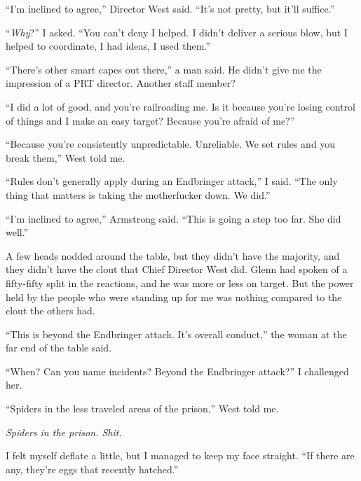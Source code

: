 ``I'm inclined to agree,'' Director West said.  ``It's not pretty, but it'll suffice.''



``\emph{Why}?'' I asked.  ``You can't deny I helped.  I didn't deliver a serious blow, but I helped to coordinate, I had ideas, I used them.''



``There's other smart capes out there,'' a man said.  He didn't give me the impression of a PRT director.  Another staff member?



``I did a lot of good, and you're railroading me.  Is it because you're losing control of things and I make an easy target?  Because you're afraid of me?''



``Because you're consistently unpredictable.  Unreliable.  We set rules and you break them,'' West told me.



``Rules don't generally apply during an Endbringer attack,'' I said.  ``The only thing that matters is taking the motherfucker down.  We did.''



``I'm inclined to agree,'' Armstrong said.  ``This is going a step too far.  She did well.''



A few heads nodded around the table, but they didn't have the majority, and they didn't have the clout that Chief Director West did.  Glenn had spoken of a fifty-fifty split in the reactions, and he was more or less on target.  But the power held by the people who were standing up for me was nothing compared to the clout the others had.



``This is beyond the Endbringer attack.  It's overall conduct,'' the woman at the far end of the table said.



``When? Can you name incidents?  Beyond the Endbringer attack?''  I challenged her.



``Spiders in the less traveled areas of the prison,'' West told me.



\emph{Spiders in the prison.  Shit}.



I felt myself deflate a little, but I managed to keep my face straight.  ``If there are any, they're eggs that recently hatched.''



